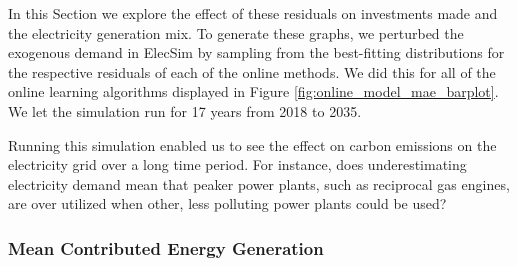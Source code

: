 \documentclass[final,3p,times,twocolumn,numbers]{elsarticle}
\begin{document}
In this Section we explore the effect of these residuals on investments made and the electricity generation mix.  To generate these graphs, we perturbed the exogenous demand in ElecSim by sampling from the best-fitting distributions for the respective residuals of each of the online methods. We did this for all of the online learning algorithms displayed in Figure \ref{fig:online_model_mae_barplot}. We let the simulation run for 17 years from 2018 to 2035. 

Running this simulation enabled us to see the effect on carbon emissions on the electricity grid over a long time period. For instance, does underestimating electricity demand mean that peaker power plants, such as reciprocal gas engines, are over utilized when other, less polluting power plants could be used?



\subsubsection{Mean Contributed Energy Generation}


\end{document}
